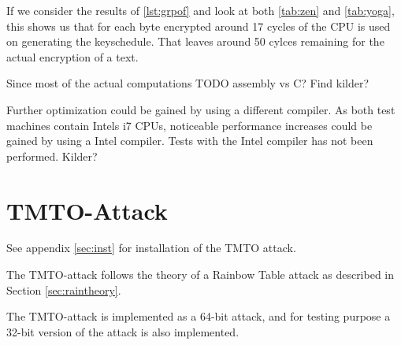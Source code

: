 If we consider the results of \ref{lst:grpof} and look at both
\ref{tab:zen} and \ref{tab:yoga}, this shows us that for each byte
encrypted around 17 cycles of the CPU is used on generating the
keyschedule. That leaves around 50 cylces remaining for the actual
encryption of a text.

Since most of the actual computations TODO assembly vs C? Find kilder?

Further optimization could be gained by using a different compiler. As
both test machines contain Intels i7 CPUs, noticeable performance
increases could be gained by using a Intel compiler. Tests with the
Intel compiler has not been performed. Kilder?


\section{TMTO-Attack}

See appendix \ref{sec:inst} for installation of the TMTO attack.

The TMTO-attack follows the theory of a Rainbow Table attack as
described in Section \ref{sec:raintheory}.

The TMTO-attack is implemented as a 64-bit attack, and for testing
purpose a 32-bit version of the attack is also implemented.


